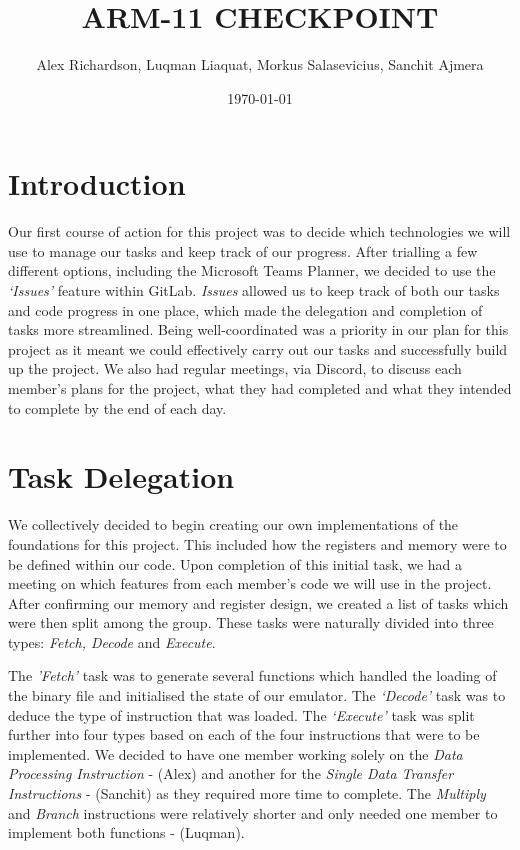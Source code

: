 \documentclass[10pt]{article}
\begin{document}
\title{\vspace{-2cm}ARM-11 CHECKPOINT}
 
\author{Alex Richardson, Luqman Liaquat, Morkus Salasevicius, Sanchit Ajmera}

\date{\today}

\maketitle

\section*{Introduction}
Our first course of action for this project was to decide which technologies we will use to manage our tasks and keep track of our progress. After trialling a few different options, including the Microsoft Teams Planner, we decided to use the
\textsl{‘Issues’} feature within GitLab. \textsl{Issues} allowed us to keep track of both our tasks and code progress in one place, which made the delegation and completion of tasks more streamlined. Being well-coordinated was a priority in our plan for this project as it meant we could effectively carry out our tasks and successfully build up the project. We also had regular meetings, via Discord, to discuss each member’s plans for the project, what they had completed and what they intended to complete by the end of each day.

\section*{Task Delegation}
We collectively decided to begin creating our own implementations of the foundations for this project. This included how the registers and memory were to be defined within our code. Upon completion of this initial task, we had a meeting on which features from each member’s code we will use in the project. After confirming our memory and register design, we created a list of tasks which were then split among the group. These tasks were naturally divided into three types: \textsl{Fetch, Decode} and \textsl{Execute}.


The \textsl{'Fetch'} task was to generate several functions which handled the loading of the binary file and initialised
the state of our emulator. The \textsl{‘Decode’} task was to deduce the type of instruction that was loaded. The \textsl{‘Execute’} task was split further into four types based on each of the four instructions that were to be implemented. We decided to have one member working solely on the \textsl{Data Processing Instruction} - (Alex) and another for the \textsl{Single Data Transfer Instructions} - (Sanchit) as they required more time to complete. The \textsl{Multiply} and \textsl{Branch} instructions were relatively shorter and only needed one member to implement both functions - (Luqman).
\end{document}
